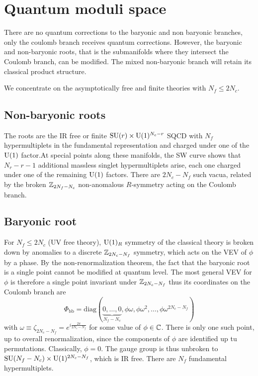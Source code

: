 \section{Quantum moduli space}\label{secquantummodulispaceSU}

    There are no quantum corrections to the baryonic and non baryonic branches, only the coulomb branch receives quantum corrections. However, the baryonic and non-baryonic roots, that is the submanifolds where they intersect the Coulomb branch, can be modified. The mixed non-baryonic branch will retain its classical product structure.

    We concentrate on the asymptotically free and finite theories with $N_f\leq2N_c$.

    \subsection{Non-baryonic roots}

        The roots are the IR free or finite $\text{SU}(r)\times\text{U}(1)^{N_c-r}$ SQCD with $N_f$ hypermultiplets in the fundamental representation and charged under one of the $\text{U}(1)$ factor.At special points along these manifolds, the SW curve shows that $N_r-r-1$ additional massless singlet hypermultiplets arise, each one charged under one of the remaining $\text{U}(1)$ factors. There are $2N_c-N_f$ such vacua, related by the broken $\mathbb{Z}_{2N_f-N_c}$ non-anomalous $R$-symmetry acting on the Coulomb branch.

    \subsection{Baryonic root}

        For $N_f\leq 2N_c$ (UV free theory), $\text{U}(1)_R$ symmetry of the classical theory is broken down by anomalies to a discrete $\mathbb{Z}_{2N_c-N_f}$ symmetry, which acts on the VEV of $\phi$ by a phase. By the non-renormalization theorem, the fact that the baryonic root is a single point cannot be modified at quantum level. The most general VEV for $\phi$ is therefore a single point invariant under $\mathbb{Z}_{2N_c-N_f}$ thus its coordinates on the Coulomb branch are
        \begin{equation}
            \Phi_{\text{bb}}=\text{diag}(\underbrace{0,\dots,0}_{N_f-N_c},\phi\omega,\phi\omega^2,\dots,\phi\omega^{2N_c-N_f})\label{eq:quantumbaryonicroot}
        \end{equation}
        with $\omega\equiv\zeta_{2N_c-N_f}=e^{i\frac{2\pi}{2N_c-N_f}}$ for some value of $\phi\in\mathbb{C}$. There is only one such point, up to overall renormalization, since the components of $\phi$ are identified up tu permutations. Classically, $\phi=0$. The gauge group is thus unbroken to $\text{SU}(N_f-N_c)\times\text{U}(1)^{2N_c-N_f}$, which is IR free. There are $N_f$ fundamental hypermultiplets. 
        
